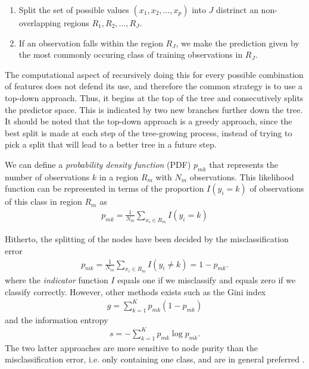 \begin{enumerate}
  \item Split the set of possible values $(x_1, x_2,...,x_p)$ into $J$ distrinct an non-overlapping regions $R_1, R_2, ..., R_{J}$.
  \item If an observation falls within the region $R_J$, we make the prediction given by the most commonly occuring class of training observations in $R_{J}$.
\end{enumerate}

The computational aspect of recursively doing this for every possible combination of features does not defend its use, and therefore the common strategy is to use a top-down approach. Thus, it begins at the top of the tree and consecutively splits the predictor space. This is indicated by two new branches further down the tree. It should be noted that the top-down approach is a greedy approach, since the best split is made at each step of the tree-growing process, instead of trying to pick a split that will lead to a better tree in a future step.

We can define a \textit{probability density function} (PDF) $p_{mk}$ that represents the number of observations $k$ in a region $R_m$ with $N_m$ observations. This likelihood function can be represented in terms of the proportion $I(y_i = k)$ of observations of this class in region $R_m$ as
\begin{align}
  p_{mk} = \frac{1}{N_m} \sum_{x_i \in R_m} I(y_i = k)
\end{align}

Hitherto, the splitting of the nodes have been decided by the misclassification error
\begin{align}
  p_{mk} = \frac{1}{N_m} \sum_{x_i \in R_m} I(y_i \neq k) = 1 - p_{mk}.
\end{align}
where the \textit{indicator} function $I$ equals one if we misclassify and equals zero if we classify correctly. However, other methods exists such as the Gini index
\begin{align}
  g = \sum_{k=1}^{K} p_{mk} (1-p_{mk})
\end{align}
and the information entropy
\begin{align}
  s = - \sum_{k=1}^{K} p_{mk} \log p_{mk}.
\end{align}
The two latter approaches are more sensitive to node purity than the misclassification error, i.e. only containing one class, and are in general preferred \cite{Murphy2012}.

